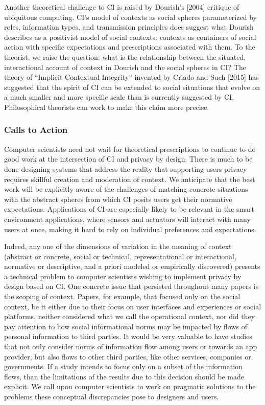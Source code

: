 \documentclass[../thesis.tex]{subfiles}
\begin{document}
Another theoretical challenge to CI is raised by
Dourish's [2004] critique of ubiquitous computing.
CI's model of contexts as social spheres parameterized
by roles, information types, and transmission principles does suggest
what Dourish describes as a positivist model of social contexts:
contexts as containers of social action with specific
expectations and
prescriptions associated with them. To the theorist, we raise the
question: what is the relationship between the situated,
interactional
account of context in Dourish and the social spheres in CI?
The theory
of ``Implicit Contextual Integrity''
invented by Criado and Such [2015] has suggested that the
spirit of CI
can be extended to social situations that evolve on a much
smaller and
more specific scale than is currently suggested by CI.
Philosophical
theorists can work to make this claim more precise.

\subsubsection{Calls to Action}
\label{CI5.2.2}

Computer scientists need not wait for theoretical prescriptions to
continue to do good work at the intersection of CI and privacy by
design. There is much to be done designing systems that address the
reality that supporting users privacy requires skillful creation and
moderation of context. We anticipate that the best work will be
explicitly aware of the challenges of matching concrete situations with
the abstract spheres from which CI posits users get their normative
expectations. Applications of CI are especially likely to be relevant
in the smart environment applications, where sensors and actuators will
interact with many users at once, making it hard to rely on individual
preferences and expectations. 

Indeed, any one of the dimensions of variation in the meaning of context
(abstract or concrete, social or technical, representational or
interactional, normative or descriptive, and a priori modeled or
empirically discovered) presents a technical problem to computer
scientists wishing to implement privacy by design based on CI. One
concrete issue that persisted throughout many papers is the scoping of
context. Papers, for example, that focused only on the social context,
be it either due to their focus on user interfaces and experiences or
social platforms, neither considered what we call the operational
context, nor did they pay attention to how social informational norms
may be impacted by flows of personal information to third parties. It
would be very valuable to have studies that not only consider norms of
information flow among users or towards an app provider, but also flows
to other third parties, like other services, companies or governments.
If a study intends to focus only on a subset of the information flows,
than the limitations of the results due to this decision should be made
explicit. We call upon computer scientists to work on pragmatic
solutions to the problems these conceptual discrepancies pose to
designers and users.
\end{document}
